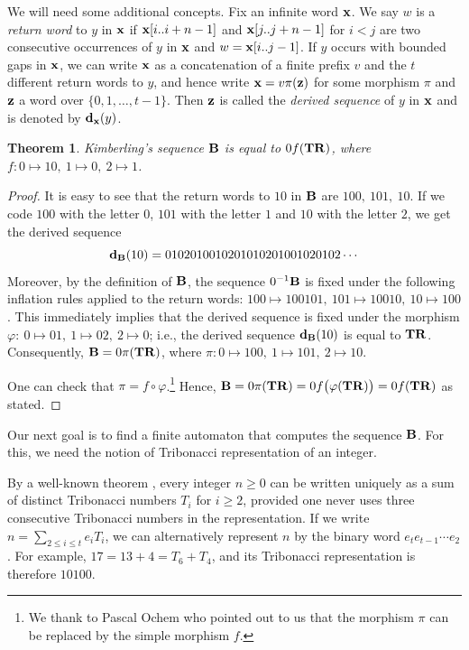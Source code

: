 \documentclass[
final
]{dmtcs-episciences}
\theoremstyle{plain}
\newtheorem{theorem}{Theorem}
\theoremstyle{definition}
\theoremstyle{remark}
\begin{document}
We will need some additional concepts.
Fix an infinite word $\bf x$.  We say $w$ is a {\it return word\/}
to $y$ in $\bf x$ if
${\bf x}[i..i+n-1]$ and ${\bf x}[j..j+n-1]$ for $i < j$ are two consecutive occurrences of $y$ in $\bf x$ and
$w = {\bf x}[i..j-1]$.   If $y$ occurs with bounded gaps in $\bf x$, we can write $\bf x$ as a concatenation of a finite prefix $v$ and the $t$ different return words to $y$, and hence write ${\bf x} =v \pi({\bf z})$ 
for some morphism $\pi$ and $\bf z$ a word over $\{ 0,1,\ldots ,t-1\}$.  Then $\bf z$ is called the {\it derived sequence} of $y$ in $\bf x$ and is denoted by ${\bf d}_{\bf x}(y)$. 

\begin{theorem}\label{thm:main}
Kimberling's sequence ${\bf B}$ is equal to $0f(\bf TR)$, where $f: 0\mapsto 10, \ 1\mapsto 0, \ 2\mapsto 1$.
\label{description}
\end{theorem}
\begin{proof}
It is easy to see that the return words to $10$ in $\bf B$ are $100, \ 101, \ 10$.
If we code $100$ with the letter $0$, $101$ with the letter $1$ and $10$ with the letter $2$, we get the derived sequence 
$${\bf d}_{\bf B}(10)=0102010010201010201001020102\cdots$$
Moreover, by the definition of $\bf B$, the sequence $0^{-1}\bf B$ is fixed under the following inflation rules applied to the return words:  $100\mapsto 100101, \ 101\mapsto 10010, \ 10\mapsto 100$. This immediately implies that the derived sequence is fixed under the morphism $\varphi: \ 0\mapsto 01, \ 1\mapsto 02, \ 2\mapsto 0$; i.e., the derived sequence ${\bf d}_{\bf B}(10)$ is equal to $\bf TR$.  Consequently, ${\bf B}=0\pi(\bf TR)$, where $\pi: 0\mapsto 100, \ 1\mapsto 101, \ 2\mapsto 10$.  

One can check that $\pi = f\circ \varphi$.\footnote{We thank to Pascal Ochem who  pointed out to us that the morphism $\pi$ can be replaced by the simple morphism $f$.}   
Hence, ${\bf B}=0\pi({\bf TR}) = 0f\bigl(\varphi({\bf TR})\bigr)  =  0f(\bf TR)$ as stated.
\end{proof}

Our next goal is to find a finite automaton that computes the sequence $\bf B$.  For this, we need the notion of Tribonacci representation of an integer.

By a well-known theorem \cite{Carlitz&Scoville&Hoggatt:1972},
every integer $n \geq 0$ can be written uniquely as a sum of
distinct Tribonacci numbers $T_i$ for $i \geq 2$, provided
one never uses three consecutive Tribonacci numbers in the
representation.   If we write
$n = \sum_{2 \leq i \leq t} e_i T_i$, we can alternatively
represent $n$ by the binary word $e_t e_{t-1} \cdots e_2$.
For example, $17 = 13 + 4 = T_6 + T_4$, and its Tribonacci representation is therefore
$10100$.
\end{document}
